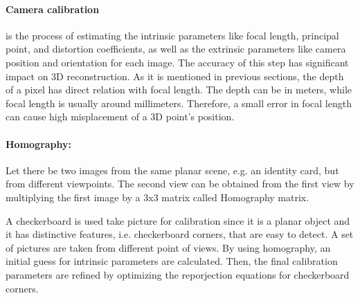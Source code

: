 \documentclass[11pt]{article}
\begin{document}
    \paragraph{Camera calibration} is the process of estimating the intrinsic parameters like focal length,
    principal point, and distortion coefficients, as well as the extrinsic parameters like camera position
    and orientation for each image. The accuracy of this step has significant impact on 3D reconstruction.
    As it is mentioned in previous sections, the depth of a pixel has direct relation with focal length. The depth
    can be in meters, while focal length is usually around millimeters. Therefore, a small error in focal length
    can cause high misplacement of a 3D point's position.

    \paragraph{Homography:} Let there be two images from the same planar scene, e.g. an identity card, but from
    different viewpoints. The second view can be obtained from the first view by multiplying the first image by
    a 3x3 matrix called Homography matrix.

    A checkerboard is used take picture for calibration since it is a planar object and it has distinctive features,
    i.e. checkerboard corners, that are easy to detect. A set of pictures are taken from different point of views.
    By using homography, an initial guess for intrinsic parameters are calculated. Then, the final calibration
    parameters are refined by optimizing the reporjection equations for checkerboard corners.
\end{document}

